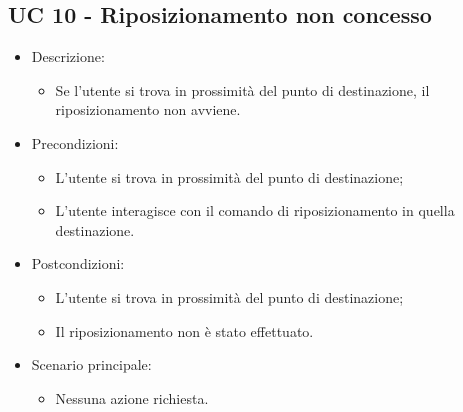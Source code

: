 \subsection{UC 10 - Riposizionamento non concesso}
\begin{itemize}

	\item Descrizione:
	\begin{itemize}
		\item Se l'utente si trova in prossimità del punto di destinazione, il riposizionamento non avviene.
	\end{itemize}
	
	\item Precondizioni:
	\begin{itemize}
		\item L'utente si trova in prossimità del punto di destinazione;
		\item L'utente interagisce con il comando di riposizionamento in quella destinazione.
	\end{itemize}
	
	\item Postcondizioni:
	\begin{itemize}
		\item L'utente si trova in prossimità del punto di destinazione;
		\item Il riposizionamento non è stato effettuato.
	\end{itemize}
	
	\item Scenario principale:
	\begin{itemize}
		\item Nessuna azione richiesta.
	\end{itemize}
	
\end{itemize}

